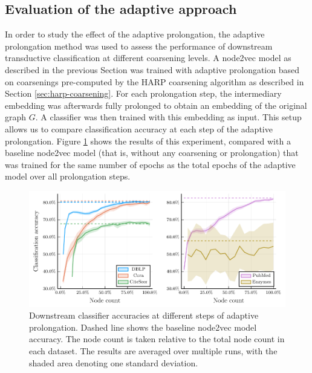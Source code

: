 \subsection{Evaluation of the adaptive approach}

In order to study the effect of the adaptive prolongation, the adaptive prolongation method was used to assess the performance of downstream transductive classification at different coarsening levels. A node2vec model as described in the previous Section was trained with adaptive prolongation based on coarsenings pre-computed by the HARP coarsening algorithm as described in Section \ref{sec:harp-coarsening}. For each prolongation step, the intermediary embedding was afterwards fully prolonged to obtain an embedding of the original graph \( G \). A classifier was then trained with this embedding as input. This setup allows us to compare classification accuracy at each step of the adaptive prolongation. Figure \ref{fig:adaptive-coarsening} shows the results of this experiment, compared with a baseline node2vec model (that is, without any coarsening or prolongation) that was trained for the same number of epochs as the total epochs of the adaptive model over all prolongation steps.

\begin{figure}
  \centering
  \includegraphics[width = \linewidth]{images/adaptive-coarsening/adaptive-coarsening.pdf}
  \caption{Downstream classifier accuracies at different steps of adaptive prolongation. Dashed line shows the baseline node2vec model accuracy. The node count is taken relative to the total node count in each dataset. The results are averaged over multiple runs, with the shaded area denoting one standard deviation.}
  \label{fig:adaptive-coarsening}
\end{figure}

